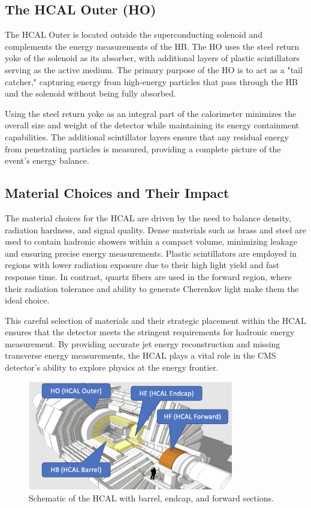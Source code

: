 \subsection{The HCAL Outer (HO)}
The HCAL Outer is located outside the superconducting solenoid and complements the energy measurements of the HB. The HO uses the steel return yoke of the solenoid as its absorber, with additional layers of plastic scintillators serving as the active medium. The primary purpose of the HO is to act as a "tail catcher," capturing energy from high-energy particles that pass through the HB and the solenoid without being fully absorbed.

Using the steel return yoke as an integral part of the calorimeter minimizes the overall size and weight of the detector while maintaining its energy containment capabilities. The additional scintillator layers ensure that any residual energy from penetrating particles is measured, providing a complete picture of the event's energy balance. \cite{hcal_tdr_outer}

\subsection{Material Choices and Their Impact}
The material choices for the HCAL are driven by the need to balance density, radiation hardness, and signal quality. Dense materials such as brass and steel are used to contain hadronic showers within a compact volume, minimizing leakage and ensuring precise energy measurements. Plastic scintillators are employed in regions with lower radiation exposure due to their high light yield and fast response time. In contrast, quartz fibers are used in the forward region, where their radiation tolerance and ability to generate Cherenkov light make them the ideal choice.

This careful selection of materials and their strategic placement within the HCAL ensures that the detector meets the stringent requirements for hadronic energy measurement. By providing accurate jet energy reconstruction and missing transverse energy measurements, the HCAL plays a vital role in the CMS detector's ability to explore physics at the energy frontier. \cite{hcal_cms_detector}

\begin{figure}[ht]
    \centering
    \includegraphics[width=0.8\textwidth]{Figures/HCAL.jpg} %
    \caption{Schematic of the HCAL with barrel, endcap, and forward sections.}
    \label{fig:hcal}
\end{figure}

